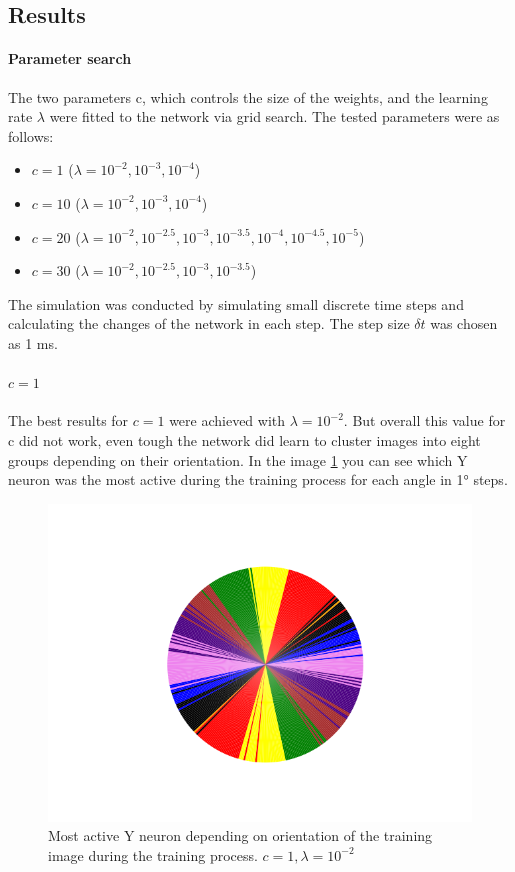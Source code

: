 \subsection{Results}

\paragraph{Parameter search}
The two parameters c, which controls the size of the weights, and the learning rate $\lambda$ were fitted to the network via grid search.	The tested parameters were as follows:
\begin{itemize}
  \item $c = 1$ ($\lambda = 10^{-2}, 10^{-3}, 10^{-4}$) 
  \item $c = 10$ ($\lambda = 10^{-2}, 10^{-3}, 10^{-4}$) 
  \item $c = 20$ ($\lambda = 10^{-2}, 10^{-2.5}, 10^{-3}, 10^{-3.5},  10^{-4}, 10^{-4.5}, 10^{-5}$) 
  \item $c = 30$ ($\lambda = 10^{-2}, 10^{-2.5}, 10^{-3}, 10^{-3.5}$) 
\end{itemize}
The simulation was conducted by simulating small discrete time steps and calculating the changes of the network in each step. The step size $\delta t$ was chosen as 1 ms.

\paragraph{$c = 1$}
The best results for $c = 1$ were achieved with $\lambda = 10^{-2}$. But overall this value for c did not work, even tough the network did learn to cluster images into eight groups depending on their orientation. In the image \ref{fig:c1Pie} you can see which Y neuron was the most active during the training process for each angle in 1° steps.

\begin{figure}
  \includegraphics[width=\linewidth]{figures/angleNetwork/c1Pie.png}
  \caption{Most active Y neuron depending on orientation of the training image during the training process. $c = 1, \lambda = 10^{-2}$}
  \label{fig:c1Pie}
\end{figure}

